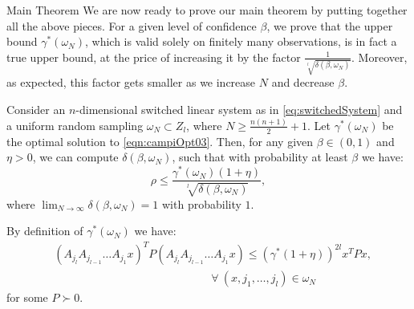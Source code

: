\begin{subsection}{Main Theorem}
We are now ready to prove our main theorem by putting together all the above pieces. For a given level of confidence $\beta$, we prove that the upper bound $\gamma^{*}(\omega_N)$, which is valid solely on finitely many observations, is in fact a true upper bound, at the price of increasing it by the factor $\frac{1}{\sqrt[l]{\delta(\beta, \omega_N)}}$. Moreover, as expected, this factor gets smaller as we increase $N$ and decrease $\beta$.


\begin{thm}\label{thm:mainTheorem}
Consider an $n$-dimensional switched linear system as in \eqref{eq:switchedSystem} and a uniform random sampling $\omega_N \subset Z_l$, where $N \geq \frac{n(n+1)}{2}+1$. Let $\gamma^{*}(\omega_N) $ be the optimal solution to \eqref{eqn:campiOpt03}. Then, for any given $\beta \in (0,1)$ and $\eta > 0$, we can compute $\delta(\beta, \omega_N)$, such that with probability at least $\beta$ we have:
$$\rho \leq \frac{\gamma^{*}(\omega_N) (1+ \eta)}{\sqrt[l]{\delta(\beta, \omega_N)}},$$
where $\lim_{N \to \infty}\delta(\beta, \omega_N) = 1$ with probability $1$.
\end{thm}


\begin{pf}

By definition of $\gamma^{*}(\omega_N)$ we have:
\begin{equation*}
\begin{aligned} 
&(A_{j_l} A_{j_{l-1}} \dots A_{j_1} x)^T P (A_{j_l} A_{j_{l-1}} \dots A_{j_1} x) \leq (\gamma^{*}(1+\eta))^{2l} x^T P x, \\
& \qquad \qquad \qquad \qquad \qquad \qquad \qquad \forall\ (x, j_1, \dots, j_l)  \in \omega_N 
\end{aligned}
\end{equation*}
for some $P \succ 0$. 


\end{pf}
\end{subsection}
